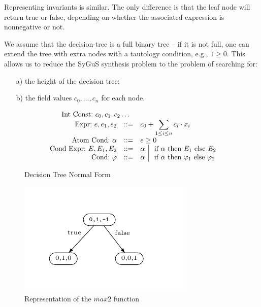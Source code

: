 \documentclass[conference]{IEEEtran}
\begin{document}
Representing invariants is similar. The only difference is that the leaf node will return true or false, depending on whether the associated expression is nonnegative or not.

We assume that the decision-tree is a full binary tree -- if it is not full, one can extend the tree with extra nodes with a tautology condition, e.g., $1 \geq 0$. This allows us to reduce the SyGuS synthesis problem to the problem of searching for:
\begin{itemize}
\item[a)] the height of the decision tree;
\item[b)] the field values $c_0, \dots, c_n$ for each node.
\end{itemize}


\begin{figure}
\begin{displaymath}
\begin{array}{rll}
\multicolumn{3}{l}{\textrm{~~~~~~Int Const:~}  c_0, c_1, c_2 \dots } \\
\textrm{~Expr:~} e, e_1, e_2 & ::= & \displaystyle c_0 + \sum_{1 \leq i \leq n}  c_i \cdot x_i \\
\textrm{~Atom Cond:~} \alpha & ::= & e \geq 0 \\
\textrm{~Cond Expr:~} E, E_1, E_2 & ::= & \displaystyle \alpha ~\big|~ \textrm{~if~} \alpha \textrm{~then~} E_1 \textrm{~else~} E_2 \\
\textrm{~Cond:~} \varphi & ::= & \alpha ~\big|~ \textrm{~if~} \alpha \textrm{~then~} \varphi_1 \textrm{~else~} \varphi_2 \\
\end{array}
\end{displaymath}
\caption{Decision Tree Normal Form}\label{fig:dtnf}
\end{figure}

\begin{figure}
\begin{center}
\unitlength=2mm
\includegraphics{figure.pdf}
\end{center}
\caption{Representation of the $max2$ function}\label{fig:max2}
\end{figure}
\end{document}
